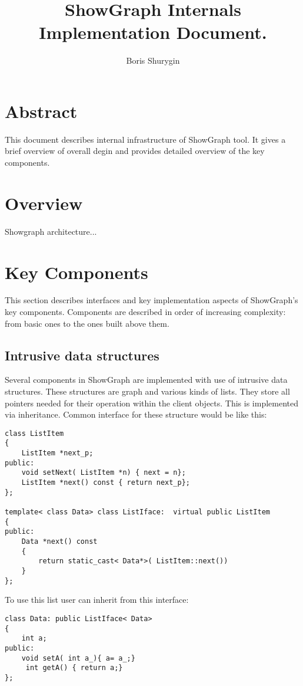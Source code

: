 \documentclass{article}
\begin{document}
 
\lstset{language=[Visual]C++}

\title{ShowGraph Internals\\Implementation Document.}
\author{Boris Shurygin}

\maketitle

\tableofcontents

\section{Abstract}
This document describes internal infrastructure of ShowGraph tool. It gives a brief overview of overall degin and provides detailed overview of the key components.
 
\section{Overview}
Showgraph architecture...
\section{Key Components}
This section describes interfaces and key implementation aspects of ShowGraph's key components. Components are described in order of increasing complexity: from basic ones to the ones built above them.
\subsection{Intrusive data structures}
Several components in ShowGraph are implemented with use of intrusive data structures. These structures are graph and various kinds of lists. They store all pointers needed for their operation within the client objects. This is implemented via inheritance. Common interface for these structure would be like this:
\begin{lstlisting}
class ListItem
{
    ListItem *next_p;
public:
    void setNext( ListItem *n) { next = n};
    ListItem *next() const { return next_p};
};

template< class Data> class ListIface:  virtual public ListItem
{
public:
    Data *next() const
    {
        return static_cast< Data*>( ListItem::next())
    }
};
\end{lstlisting}
To use this list user can inherit from this interface:
\begin{lstlisting}
class Data: public ListIface< Data> 
{
    int a;
public:
    void setA( int a_){ a= a_;}
	 int getA() { return a;}
};
\end{lstlisting}
\end{document}
